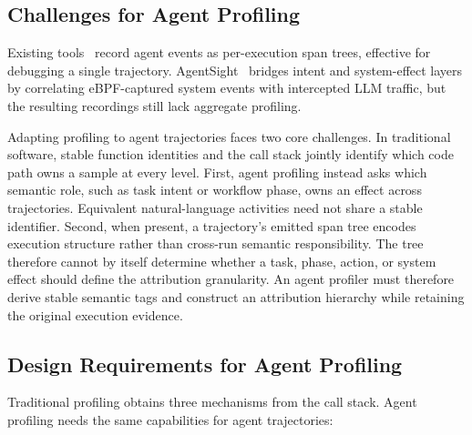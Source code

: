 \documentclass[letterpaper]{article}
\begin{document}
\subsection{Challenges for Agent Profiling}

Existing tools~\cite{langsmith,langfuse,phoenix,otel} record agent
events as per-execution span trees, effective for debugging a single
trajectory.
AgentSight~\cite{agentsight} bridges intent and system-effect layers
by correlating eBPF-captured system events with intercepted LLM
traffic, but the resulting recordings still lack aggregate profiling.


Adapting profiling to agent trajectories faces two core challenges.
In traditional software, stable function identities and
the call stack jointly identify which code path owns a sample at every
level. First, agent profiling instead asks which semantic role, such as task
intent or workflow phase, owns an effect across trajectories. Equivalent
natural-language activities need not share a stable identifier. Second, when
present, a trajectory's emitted span tree encodes execution structure
rather than cross-run semantic responsibility. The tree therefore cannot
by itself determine whether a task, phase, action, or system effect
should define the attribution granularity.
An agent profiler must therefore derive stable semantic tags and construct an
attribution hierarchy while retaining the original execution evidence.

\subsection{Design Requirements for Agent Profiling}

Traditional profiling obtains three mechanisms from the call stack. Agent
profiling needs the same capabilities for agent trajectories:
\end{document}
